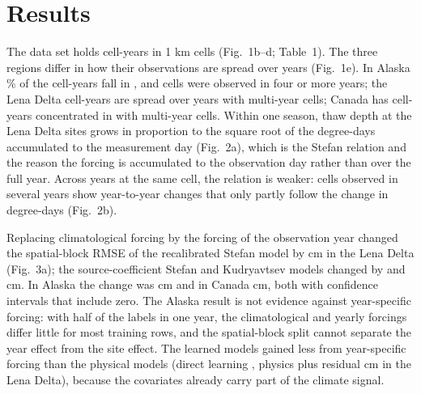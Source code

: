 \section{Results}\label{sec:results}

The data set holds \nncyAll{} cell-years in \nncellAll{} 1 km cells (Fig.~1b--d; Table~1). The three regions differ in how their observations are spread over years (Fig.~1e). In Alaska \ntopyrshareAk{}\% of the cell-years fall in \ntopyrAk{}, and \nnmultiAk{} cells were observed in four or more years; the Lena Delta cell-years are spread over \nnyrLe{} years with \nnmultiLe{} multi-year cells; Canada has \nncyCa{} cell-years concentrated in \ntopyrCa{} with \nnmultiCa{} multi-year cells. Within one season, thaw depth at the Lena Delta sites grows in proportion to the square root of the degree-days accumulated to the measurement day (Fig.~2a), which is the Stefan relation and the reason the forcing is accumulated to the observation day rather than over the full year. Across years at the same cell, the relation is weaker: cells observed in several years show year-to-year changes that only partly follow the change in degree-days (Fig.~2b).

Replacing climatological forcing by the forcing of the observation year changed the spatial-block RMSE of the recalibrated Stefan model by \ndforcLePo{} cm in the Lena Delta (Fig.~3a); the source-coefficient Stefan and Kudryavtsev models changed by \ndforcLePz{} and \ndforcLeKu{} cm. In Alaska the change was \ndforcAkPo{} cm and in Canada \ndforcCaPo{} cm, both with confidence intervals that include zero. The Alaska result is not evidence against year-specific forcing: with half of the labels in one year, the climatological and yearly forcings differ little for most training rows, and the spatial-block split cannot separate the year effect from the site effect. The learned models gained less from year-specific forcing than the physical models (direct learning \ndforcLeDz{}, physics plus residual \ndforcLeRo{} cm in the Lena Delta), because the covariates already carry part of the climate signal.

